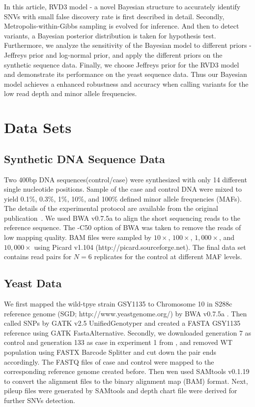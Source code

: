 \documentclass[11pt,reqno]{amsart}
\begin{document}
In this article, RVD3 model - a novel Bayesian structure to accurately identify SNVs with small false discovery rate is first described in detail.
Secondly, Metropolis-within-Gibbs sampling is evolved for inference. And then to detect variants, a Bayesian posterior distribution is taken for hypothesis test.
Furthermore, we analyze the sensitivity of the Bayesian model to different priors - Jeffreys prior and log-normal prior, and apply the different priors on the synthetic sequence data.
Finally, we choose Jeffreys prior for the RVD3 model and demonstrate its performance on the yeast sequence data.
Thus our Bayesian model achieves a enhanced robustness and accuracy when calling variants for the low read depth and minor allele frequencies.

\section{Data Sets}

\subsection{Synthetic DNA Sequence Data}

Two 400bp DNA sequences(control/case) were synthesized with only 14 different single nucleotide positions. Sample of the case and control DNA were mixed to yield 0.1\%, 0.3\%, 1\%, 10\%, and 100\% defined minor allele frequencies (MAFs).
The details of the experimental protocol are available from the original publication~\citep{Flaherty:2011ja}.
We used BWA v0.7.5a to align the short sequencing reads to the reference sequence. The -C50 option of BWA was taken to remove the reads of low mapping quality.
BAM files were sampled by $10\times$, $100\times$, $1,000\times$, and $10,000\times$ using Picard v1.104 (http://picard.sourceforge.net).
The final data set contains read pairs for $N=6$ replicates for the control at different MAF levels.

\subsection{Yeast Data}
We first mapped the wild-tpye strain GSY1135 \citep{kvitek2011reciprocal} to Chromosome 10 in S288c reference genome (SGD; http://www.yeastgenome.org/) by BWA v0.7.5a \citep{li2009fast}.
Then called SNPs by GATK v2.5 UnifiedGenotyper \citep{McKenna:2010bva, depristo2011framework} and created a FASTA GSY1135 reference using GATK FastaAlternative.
Secondly, we downloaded generation 7 as control and generation 133 as case in experiment 1 from \citep{kvitek2013whole}, and removed WT population using FASTX Barcode Splitter and cut down the pair ends accordingly.
The FASTQ files of case and control were mapped to the corresponding reference genome created before.
Then wen used SAMtools v0.1.19 \citep{li2009sequence} to convert the alignment files to the binary alignment map (BAM) format.
Next, pileup files were generated by SAMtools and depth chart file were derived for further SNVs detection.
\end{document}
